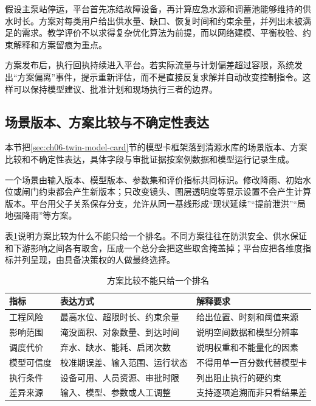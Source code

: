假设主泵站停运，平台首先冻结故障设备，再计算应急水源和调蓄池能够维持的供水时长。方案对每类用户给出供水量、缺口、恢复时间和约束余量，并列出未被满足的需求。教学评价不以求得复杂优化算法为前提，而以网络建模、平衡校验、约束解释和方案留痕为重点。

方案发布后，执行回执持续进入平台。若实际流量与计划偏差超过容限，系统发出“方案偏离”事件，提示重新评估，而不是直接反复求解并自动改变控制指令。这样可以保持模型建议、批准计划和现场执行三者的边界。

\subsection{场景版本、方案比较与不确定性表达}\label{sec:ch08-twin-model-card}

本节把\ref{sec:ch06-twin-model-card}节的模型卡框架落到清源水库的场景版本、方案比较和不确定性表达，具体字段与审批证据按案例数据和模型运行记录生成。

一个场景由输入版本、模型版本、参数集和评价指标共同标识。修改降雨、初始水位或闸门约束都会产生新版本；只改变镜头、图层透明度等显示设置不会产生计算版本。平台用父子关系保存分支，允许从同一基线形成“现状延续”“提前泄洪”“局地强降雨”等方案。

表\ref{tab:scenario-comparison}说明方案比较为什么不能只给一个排名。不同方案往往在防洪安全、供水保证和下游影响之间各有取舍，压成一个总分会把这些取舍掩盖掉；平台应把各维度指标并列呈现，由具备决策权的人做最终选择。

\begin{table}[htbp]
\centering
\caption{方案比较不能只给一个排名}
\label{tab:scenario-comparison}
\begin{tabular}{p{2.4cm}p{4.4cm}p{5.7cm}}
\toprule
指标 & 表达方式 & 解释要求 \\
\midrule
工程风险 & 最高水位、超限时长、约束余量 & 给出位置、时刻和阈值来源 \\
影响范围 & 淹没面积、对象数量、到达时间 & 说明空间数据和模型分辨率 \\
调度代价 & 弃水、缺水、能耗、启闭次数 & 说明权重和不能量化的因素 \\
模型可信度 & 校准期误差、输入范围、运行状态 & 不得用单一百分数代替模型卡 \\
执行条件 & 设备可用、人员资源、审批时限 & 列出阻止执行的硬约束 \\
差异来源 & 输入、模型、参数或人工调整 & 支持逐项追溯而非只看结果差 \\
\bottomrule
\end{tabular}
\end{table}

